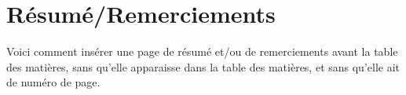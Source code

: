 \chapter*{Résumé/Remerciements}
\thispagestyle{empty}

Voici comment insérer une page de résumé et/ou de remerciements avant la table des matières, sans qu'elle apparaisse dans la table des matières, et sans qu'elle ait de numéro de page.

\newpage
